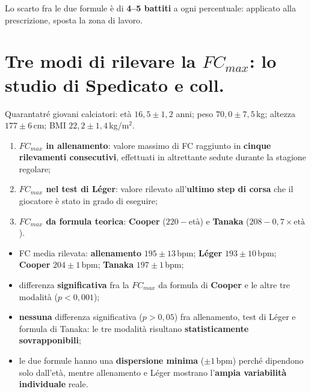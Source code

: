 Lo scarto fra le due formule è di \textbf{4--5 battiti} a ogni percentuale: applicato alla
prescrizione, sposta la zona di lavoro.

\section{Tre modi di rilevare la \texorpdfstring{$FC_{max}$}{FCmax}: lo studio di Spedicato e coll.}

Quarantatré giovani calciatori: età $16{,}5 \pm 1{,}2$ anni; peso $70{,}0 \pm 7{,}5$\,kg; altezza
$177 \pm 6$\,cm; BMI $22{,}2 \pm 1{,}4$\,kg/m$^2$.

\begin{enumerate}
  \item \textbf{$FC_{max}$ in allenamento}: valore massimo di FC raggiunto in \textbf{cinque
    rilevamenti consecutivi}, effettuati in altrettante sedute durante la stagione regolare;
  \item \textbf{$FC_{max}$ nel test di Léger}: valore rilevato all'\textbf{ultimo step di corsa} che
    il giocatore è stato in grado di eseguire;
  \item \textbf{$FC_{max}$ da formula teorica}: \textbf{Cooper} ($220 - \textrm{et\`a}$) e
    \textbf{Tanaka} ($208 - 0{,}7 \times \textrm{et\`a}$).
\end{enumerate}

\begin{itemize}
  \item FC media rilevata: \textbf{allenamento} $195 \pm 13$\,bpm; \textbf{Léger} $193 \pm 10$\,bpm;
    \textbf{Cooper} $204 \pm 1$\,bpm; \textbf{Tanaka} $197 \pm 1$\,bpm;
  \item differenza \textbf{significativa} fra la $FC_{max}$ da formula di \textbf{Cooper} e le altre
    tre modalità ($p<0{,}001$);
  \item \textbf{nessuna} differenza significativa ($p>0{,}05$) fra allenamento, test di Léger e
    formula di Tanaka: le tre modalità risultano \textbf{statisticamente sovrapponibili};
  \item le due formule hanno una \textbf{dispersione minima} ($\pm 1$\,bpm) perché dipendono solo
    dall'età, mentre allenamento e Léger mostrano l'\textbf{ampia variabilità individuale} reale.
\end{itemize}

